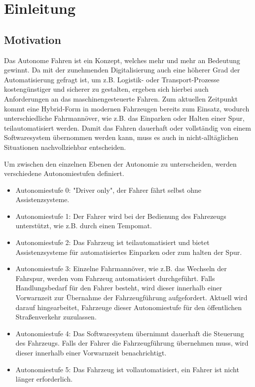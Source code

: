 \chapter{Einleitung}
\section{Motivation}
Das Autonome Fahren ist ein Konzept, welches mehr und mehr an Bedeutung gewinnt. Da mit der zunehmenden
Digitalisierung auch eine höherer Grad der Automatisierung gefragt ist, um z.B. Logistik- oder Transport-Prozesse 
kostengünstiger und sicherer zu gestalten, ergeben sich hierbei auch Anforderungen an das maschinengesteuerte Fahren.
Zum aktuellen Zeitpunkt kommt eine Hybrid-Form in modernen Fahrzeugen bereits zum Einsatz, wodurch unterschiedliche 
Fahrmannöver, wie z.B. das Einparken oder Halten einer Spur, teilautomatisiert werden. Damit das Fahren dauerhaft oder
vollständig von einem Softwaresystem übernommen werden kann, muss es auch in nicht-alltäglichen Situationen nachvollziehbar
entscheiden.

Um zwischen den einzelnen Ebenen der Autonomie zu unterscheiden, werden verschiedene Autonomiestufen definiert.
\begin{itemize}
    \item Autonomiestufe 0: "Driver only", der Fahrer fährt selbst ohne Assistenzsysteme.
    \item Autonomiestufe 1: Der Fahrer wird bei der Bedienung des Fahrezeugs unterstützt, wie z.B. durch einen Tempomat.
    \item Autonomiestufe 2: Das Fahrzeug ist teilautomatisiert und bietet Assistenzsysteme für automatisiertes Einparken 
                            oder zum halten der Spur.
    \item Autonomiestufe 3: Einzelne Fahrmannöver, wie z.B. das Wechseln der Fahrspur, werden vom Fahrzeug automatisiert durchgeführt.
                            Falls Handlungsbedarf für den Fahrer besteht, wird dieser innerhalb einer Vorwarnzeit zur Übernahme
                            der Fahrzeugführung aufgefordert. Aktuell wird darauf hingearbeitet, Fahrzeuge dieser Autonomiestufe
                            für den öffentlichen Straßenverkehr zuzulassen.
    \item Autonomiestufe 4: Das Softwaresystem übernimmt dauerhaft die Steuerung des Fahrzeugs. Falls der Fahrer die Fahrzeugführung
                            übernehmen muss, wird dieser innerhalb einer Vorwarnzeit benachrichtigt.
    \item Autonomiestufe 5: Das Fahrzeug ist vollautomatisiert, ein Fahrer ist nicht länger erforderlich. \cite{BASt}
\end{itemize}

